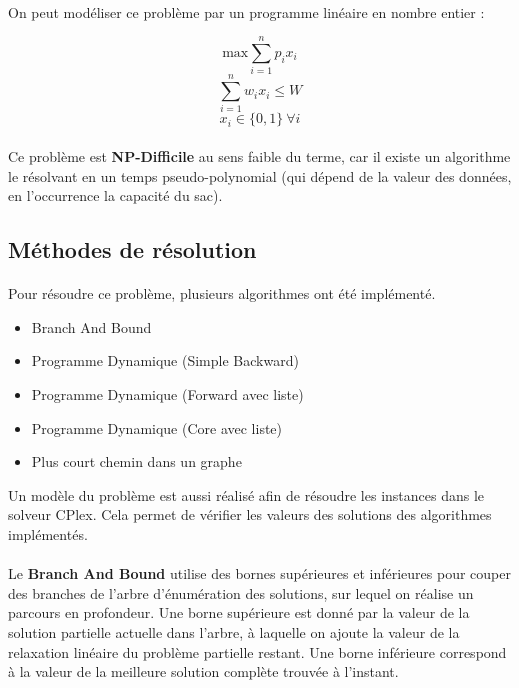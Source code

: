 \documentclass[12pt]{article}
\begin{document}
\paragraph{}On peut modéliser ce problème par un programme linéaire en nombre entier :

\[\textrm{max} \sum_{i=1}^{n} p_i x_i\]
\[\sum_{i=1}^{n} w_i x_i \leq W\]
\[x_i \in \lbrace0,1\rbrace\ \forall{i}\]

\paragraph{}Ce problème est \textbf{NP-Difficile} au sens faible du terme, car il existe un algorithme le résolvant en un temps pseudo-polynomial (qui dépend de la valeur des données, en l'occurrence la capacité du sac). 

\subsection{Méthodes de résolution}

\paragraph{}Pour résoudre ce problème, plusieurs algorithmes ont été implémenté.
\begin{itemize}
	\item Branch And Bound
	\item Programme Dynamique (Simple Backward)
	\item Programme Dynamique (Forward avec liste)
	\item Programme Dynamique (Core avec liste)
	\item Plus court chemin dans un graphe
\end{itemize}
Un modèle du problème est aussi réalisé afin de résoudre les instances dans le solveur CPlex. Cela permet de vérifier les valeurs des solutions des algorithmes implémentés.

\paragraph{}Le \textbf{Branch And Bound} utilise des bornes supérieures et inférieures pour couper des branches de l'arbre d'énumération des solutions, sur lequel on réalise un parcours en profondeur. Une borne supérieure est donné par la valeur de la solution partielle actuelle dans l'arbre, à laquelle on ajoute la valeur de la relaxation linéaire du problème partielle restant. Une borne inférieure correspond à la valeur de la meilleure solution complète trouvée à l'instant.
\end{document}
